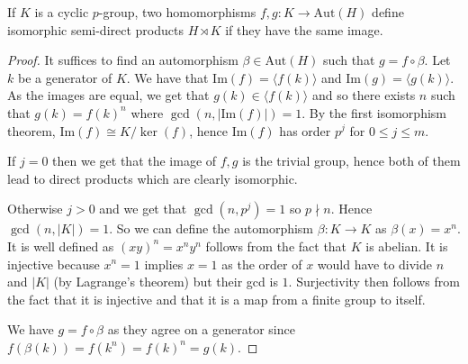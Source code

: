 \documentclass[a4paper,11pt, titlepage]{article}
\theoremstyle{remark}
\begin{document}
\begin{lemma}\label{$K$ cyclic $p$-group then equal images define isomorphic semi-direct products}
    If $K$ is a cyclic $p$-group, two homomorphisms $f, g : K \rightarrow \text{Aut}(H)$ define isomorphic semi-direct products $H \rtimes K$ if they have the same image.
\end{lemma}
\begin{proof}
    It suffices to find an automorphism $\beta \in \text{Aut}(H)$ such that $g = f \circ \beta$. Let $k$ be a generator of $K$. We have that $\text{Im}(f) = \langle f(k) \rangle$ and $\text{Im}(g) = \langle g(k) \rangle$. As the images are equal, we get that $g(k) \in \langle f(k) \rangle$ and so there exists $n$ such that $g(k) = f(k)^n$ where $\gcd(n, |\text{Im}(f)|) = 1$. By the first isomorphism theorem, $\text{Im}(f) \cong K / \ker(f)$, hence $\text{Im}(f)$ has order $p^j$ for $0 \leq j \leq m$. 
    
    If $j = 0$ then we get that the image of $f, g$ is the trivial group, hence both of them lead to direct products which are clearly isomorphic. 
    
    Otherwise $j > 0$ and we get that $\gcd(n, p^j) = 1$ so $p \nmid n$. Hence $\gcd(n, |K|) = 1$. So we can define the automorphism $\beta : K \rightarrow K$ as $\beta(x) = x^n$. It is well defined as $(xy)^n = x^n y^n$ follows from the fact that $K$ is abelian. It is injective because $x^n = 1$ implies $x = 1$ as the order of $x$ would have to divide $n$ and $|K|$ (by Lagrange's theorem) but their gcd is $1$. Surjectivity then follows from the fact that it is injective and that it is a map from a finite group to itself.

    We have $g = f \circ \beta$ as they agree on a generator since $f(\beta(k)) = f(k^n) = f(k)^n = g(k)$.
\end{proof}
\end{document}
